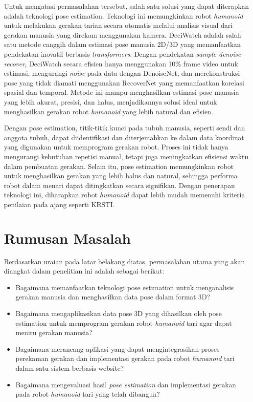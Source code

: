 Untuk mengatasi permasalahan tersebut, salah satu solusi yang dapat diterapkan adalah teknologi pose estimation. Teknologi ini memungkinkan robot \textit{humanoid} untuk melakukan gerakan tarian secara otomatis melalui analisis visual dari gerakan manusia yang direkam menggunakan kamera. DeciWatch adalah salah satu metode canggih dalam estimasi pose manusia 2D/3D yang memanfaatkan pendekatan inovatif berbasis \textit{transformers}. Dengan pendekatan \textit{sample-denoise-recover}, DeciWatch secara efisien hanya menggunakan 10\% frame video untuk estimasi, mengurangi \textit{noise} pada data dengan DenoiseNet, dan merekonstruksi pose yang tidak diamati menggunakan RecoverNet yang memanfaatkan korelasi spasial dan temporal. Metode ini mampu menghasilkan estimasi pose manusia yang lebih akurat, presisi, dan halus, menjadikannya solusi ideal untuk menghasilkan gerakan robot \textit{humanoid} yang lebih natural dan efisien.

Dengan pose estimation, titik-titik kunci pada tubuh manusia, seperti sendi dan anggota tubuh, dapat diidentifikasi dan diterjemahkan ke dalam data koordinat yang digunakan untuk memprogram gerakan robot. Proses ini tidak hanya mengurangi kebutuhan repetisi manual, tetapi juga meningkatkan efisiensi waktu dalam pembuatan gerakan. Selain itu, pose estimation memungkinkan robot untuk menghasilkan gerakan yang lebih halus dan natural, sehingga performa robot dalam menari dapat ditingkatkan secara signifikan. Dengan penerapan teknologi ini, diharapkan robot \textit{humanoid} dapat lebih mudah memenuhi kriteria penilaian pada ajang seperti KRSTI. 


\section{Rumusan Masalah}
Berdasarkan uraian pada latar belakang diatas, permasalahan utama yang akan diangkat dalam penelitian ini adalah sebagai berikut:

\begin{itemize}
    \item Bagaimana memanfaatkan teknologi pose estimation untuk menganalisis gerakan manusia dan menghasilkan data pose dalam format 3D?
    \item Bagaimana mengaplikasikan data pose 3D yang dihasilkan oleh pose estimation untuk memprogram gerakan robot \textit{humanoid} tari agar dapat meniru gerakan manusia?
    \item Bagaimana merancang aplikasi yang dapat mengintegrasikan proses perekaman gerakan dan implementasi gerakan pada robot \textit{humanoid} tari dalam satu sistem berbasis website?
    \item Bagaimana mengevaluasi hasil \textit{pose estimation} dan implementasi gerakan pada robot \textit{humanoid} tari yang telah dibangun?
\end{itemize}

